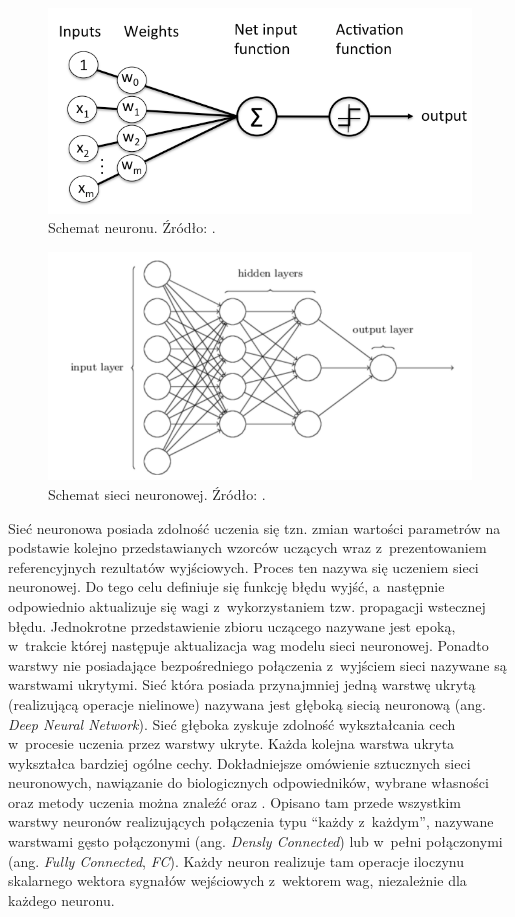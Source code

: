 \begin{figure}
    \centering
    \includegraphics[width=0.6\linewidth]{images/neuron.png}
    \caption{Schemat neuronu. Źródło: \cite{neuron}.}
    \label{fig:neuron}
\end{figure}
\begin{figure}
    \centering
    \includegraphics[width=0.6\linewidth]{images/net_schem.png}
    \caption{Schemat sieci neuronowej. Źródło: \cite{net_schem}.}
    \label{fig:net_schem}
\end{figure}

Sieć neuronowa posiada zdolność uczenia się tzn. zmian wartości parametrów na podstawie kolejno przedstawianych wzorców uczących wraz z~prezentowaniem referencyjnych rezultatów wyjściowych.
Proces ten nazywa się uczeniem sieci neuronowej.
Do tego celu definiuje się funkcję błędu wyjść, a~następnie odpowiednio aktualizuje się wagi z~wykorzystaniem tzw. propagacji wstecznej błędu.
Jednokrotne przedstawienie zbioru uczącego nazywane jest epoką, w~trakcie której następuje aktualizacja wag modelu sieci neuronowej.
Ponadto warstwy nie posiadające bezpośredniego połączenia z~wyjściem sieci nazywane są warstwami ukrytymi.
Sieć która posiada przynajmniej jedną warstwę ukrytą (realizującą operacje nielinowe) nazywana jest głęboką siecią neuronową (ang. \emph{Deep Neural Network}).
Sieć głęboka zyskuje zdolność wykształcania cech w~procesie uczenia przez warstwy ukryte. 
Każda kolejna warstwa ukryta wykształca bardziej ogólne cechy. 
Dokładniejsze omówienie sztucznych sieci neuronowych, nawiązanie do biologicznych odpowiedników, wybrane własności oraz metody uczenia można znaleźć \cite{SN_tadeusiewicz} oraz \cite{net_train}. 
Opisano tam przede wszystkim warstwy neuronów realizujących połączenia typu ``każdy z~każdym'', nazywane warstwami gęsto połączonymi (ang. \emph{Densly Connected}) lub w~pełni połączonymi (ang. \emph{Fully Connected}, \emph{FC}). 
Każdy neuron realizuje tam operacje iloczynu skalarnego wektora sygnałów wejściowych z~wektorem wag, niezależnie dla każdego neuronu.

